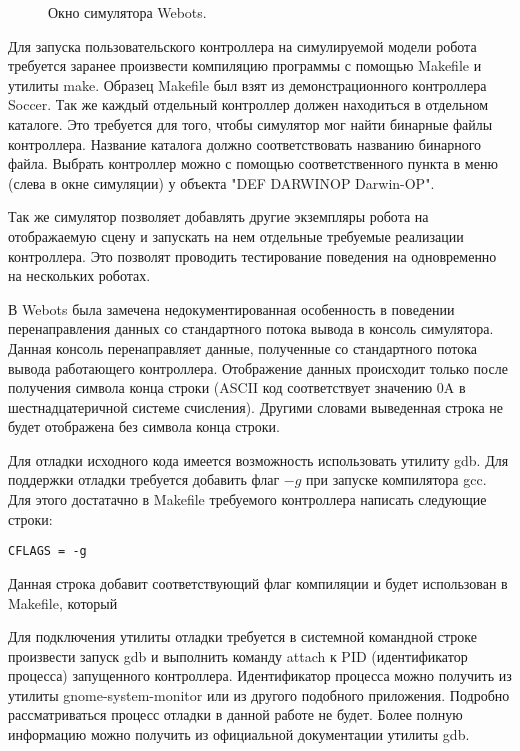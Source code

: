 \begin{figure}[h]
\caption{Окно симулятора Webots.}
\label{im:1_webots_sample_window}
\end{figure}

Для запуска пользовательского контроллера на симулируемой модели робота требуется заранее произвести компиляцию программы с помощью Makefile и утилиты make. Образец Makefile был взят из демонстрационного контроллера Soccer. Так же каждый отдельный контроллер должен находиться в отдельном каталоге. Это требуется для того, чтобы симулятор мог найти бинарные файлы контроллера. Название каталога должно соответствовать названию бинарного файла. Выбрать контроллер можно с помощью соответственного пункта в меню (слева в окне симуляции) у объекта "DEF DARWINOP Darwin-OP".

Так же симулятор позволяет добавлять другие экземпляры робота на отображаемую сцену и запускать на нем отдельные требуемые реализации контроллера. Это позволят проводить тестирование поведения на одновременно на нескольких роботах.

В Webots была замечена недокументированная особенность в поведении перенаправления данных со стандартного потока вывода в консоль симулятора. Данная консоль перенаправляет данные, полученные со стандартного потока вывода работающего контроллера. Отображение данных происходит только после получения символа конца строки (ASCII код соответствует значению 0A в шестнадцатеричной системе счисления). Другими словами выведенная строка не будет отображена без символа конца строки.

Для отладки исходного кода имеется возможность использовать утилиту gdb. Для поддержки отладки требуется добавить флаг $-g$ при запуске компилятора gcc. Для этого достатачно в Makefile требуемого контроллера написать следующие строки:

\lstset{language=[gnu] make}
\begin{lstlisting}
CFLAGS = -g
\end{lstlisting}

Данная строка добавит соответствующий флаг компиляции и будет использован в Makefile, который 

Для подключения утилиты отладки требуется в системной командной строке произвести запуск gdb и выполнить команду attach к PID (идентификатор процесса) запущенного контроллера. Идентификатор процесса можно получить из утилиты gnome-system-monitor или из другого подобного приложения. Подробно рассматриваться процесс отладки в данной работе не будет. Более полную информацию можно получить из официальной документации утилиты gdb.

